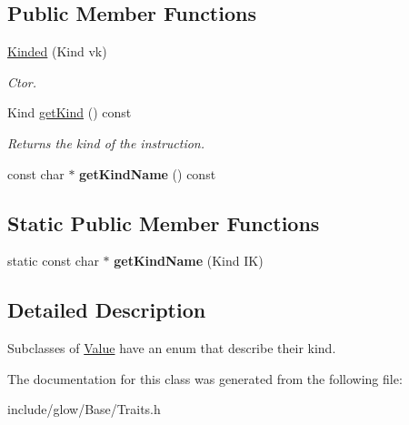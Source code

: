 \subsection*{Public Member Functions}
\begin{DoxyCompactItemize}
\item 
\mbox{\label{classglow_1_1_kinded_a9b8409bbf440dd4311cc43aea3354b72}} 
\hyperlink{classglow_1_1_kinded_a9b8409bbf440dd4311cc43aea3354b72}{Kinded} (Kind vk)
\begin{DoxyCompactList}\small\item\em Ctor. \end{DoxyCompactList}\item 
\mbox{\label{classglow_1_1_kinded_a4c279eca46b25dce84795ef618e38071}} 
Kind \hyperlink{classglow_1_1_kinded_a4c279eca46b25dce84795ef618e38071}{get\+Kind} () const
\begin{DoxyCompactList}\small\item\em Returns the kind of the instruction. \end{DoxyCompactList}\item 
\mbox{\label{classglow_1_1_kinded_a8cc07704564602612f0414548be4895b}} 
const char $\ast$ {\bfseries get\+Kind\+Name} () const
\end{DoxyCompactItemize}
\subsection*{Static Public Member Functions}
\begin{DoxyCompactItemize}
\item 
\mbox{\label{classglow_1_1_kinded_a8352d6787c9844f02927b0958de0bc48}} 
static const char $\ast$ {\bfseries get\+Kind\+Name} (Kind IK)
\end{DoxyCompactItemize}


\subsection{Detailed Description}
Subclasses of \hyperlink{classglow_1_1_value}{Value} have an enum that describe their kind. 

The documentation for this class was generated from the following file\+:\begin{DoxyCompactItemize}
\item 
include/glow/\+Base/Traits.\+h\end{DoxyCompactItemize}
